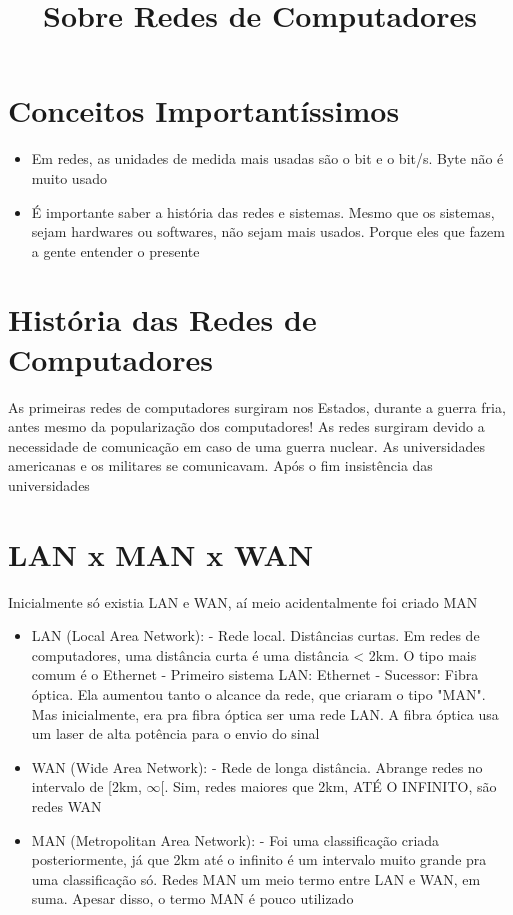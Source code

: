 \documentclass{article}
\title{Sobre Redes de Computadores}
\begin{document}
\maketitle

\section{Conceitos Importantíssimos}
\begin{itemize}
    \item Em redes, as unidades de medida mais usadas são o bit e o bit/s. Byte não é muito usado
    \item É importante saber a história das redes e sistemas. Mesmo que os sistemas, sejam hardwares ou softwares, não sejam mais usados. Porque eles que fazem a gente entender o presente
\end{itemize}

\section{História das Redes de Computadores}
As primeiras redes de computadores surgiram nos Estados, durante a guerra fria, antes mesmo da popularização dos computadores! As redes surgiram devido a necessidade de comunicação em caso de uma guerra nuclear. As universidades americanas e os militares se comunicavam. Após o fim insistência das universidades

\section{LAN x MAN x WAN}
Inicialmente só existia LAN e WAN, aí meio acidentalmente foi criado MAN
\begin{itemize}


\item LAN (Local Area Network):
- Rede local. Distâncias curtas. Em redes de computadores, uma distância curta é uma distância < 2km. O tipo mais comum é o Ethernet
- Primeiro sistema LAN: Ethernet
- Sucessor: Fibra óptica. Ela aumentou tanto o alcance da rede, que criaram o tipo "MAN". Mas inicialmente, era pra fibra óptica ser uma rede LAN. A fibra óptica usa um laser de alta potência para o envio do sinal

\item WAN (Wide Area Network):
- Rede de longa distância. Abrange redes no intervalo de [2km, $\infty$[. Sim, redes maiores que 2km, ATÉ O INFINITO, são redes WAN

\item MAN (Metropolitan Area Network):
- Foi uma classificação criada posteriormente, já que 2km até o infinito é um intervalo muito grande pra uma classificação só. Redes MAN um meio termo entre LAN e WAN, em suma. Apesar disso, o termo MAN é pouco utilizado
\end{itemize}
\end{document}
